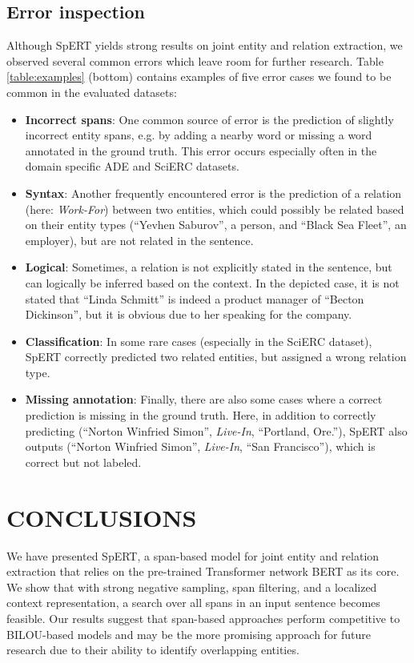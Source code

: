 \documentclass{ecai}
\begin{document}
\subsection{Error inspection}
Although SpERT yields strong results on joint entity and relation extraction, we observed several common errors which leave room for further research. Table \ref{table:examples} (bottom) contains examples of five error cases we found to be common in the evaluated datasets:

\begin{itemize}
    \item \textbf{Incorrect spans}: One common source of error is the prediction of slightly incorrect entity spans, e.g. by adding a nearby word or missing a word annotated in the ground truth. This error occurs especially often in the domain specific ADE and SciERC datasets. 
    \item \textbf{Syntax}: Another frequently encountered error is the prediction of a relation (here: \emph{Work-For}) between two entities, which could possibly be related based on their entity types (\enquote{Yevhen  Saburov}, a person, and \enquote{Black Sea Fleet}, an employer), but are not related in the sentence.
    \item \textbf{Logical}: Sometimes, a relation is not explicitly stated in the sentence, but can logically be inferred based on the context. In the depicted case, it is not stated that \enquote{Linda Schmitt} is indeed a product manager of \enquote{Becton Dickinson}, but it is obvious due to her speaking for the company.
    \item \textbf{Classification}: In some rare cases (especially in the SciERC dataset), SpERT correctly predicted two related entities, but assigned a wrong relation type. 
    \item \textbf{Missing annotation}: Finally, there are also some cases where a correct prediction is missing in the ground truth. Here, in addition to correctly predicting (\enquote{Norton Winfried Simon}, \emph{Live-In}, \enquote{Portland, Ore.}), SpERT also outputs (\enquote{Norton Winfried Simon}, \emph{Live-In}, \enquote{San Francisco}), which is correct but not labeled.
\end{itemize}

\section{CONCLUSIONS}
We have presented SpERT, a span-based model for joint entity and relation extraction that relies on the pre-trained Transformer network BERT as its core. We show that with strong negative sampling, span filtering, and a localized context representation, a search over all spans in an input sentence becomes feasible. Our results suggest that span-based approaches perform competitive to BILOU-based models and may be the more promising approach for future research due to their ability to identify overlapping entities.
\end{document}
